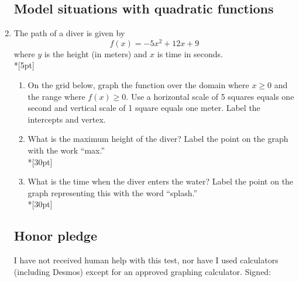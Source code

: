 \documentclass[]{book}
\begin{document}
\begin{enumerate}
\subsection*{Model situations with quadratic functions}
\item The path of a diver is given by 
\[f(x)=-5x^2+12x+9\]
where $y$ is the height (in meters) and $x$ is time in seconds.\\*[5pt]
\begin{enumerate}
    \item On the grid below, graph the function over the domain where $x\geq 0$ and the range where $f(x) \geq 0$. Use a horizontal scale of 5 squares equals one second and vertical scale of 1 square equals one meter. Label the intercepts and vertex.
    \item What is the maximum height of the diver? Label the point on the graph with the work ``max.''\\*[30pt]
    \item What is the time when the diver enters the water? Label the point on the graph representing this with the word ``splash.''\\*[30pt]
\end{enumerate}


\subsection*{Honor pledge}
I have not received human help with this test, nor have I used calculators (including Desmos) except for an approved graphing calculator. Signed:

\end{enumerate}
\end{document}
